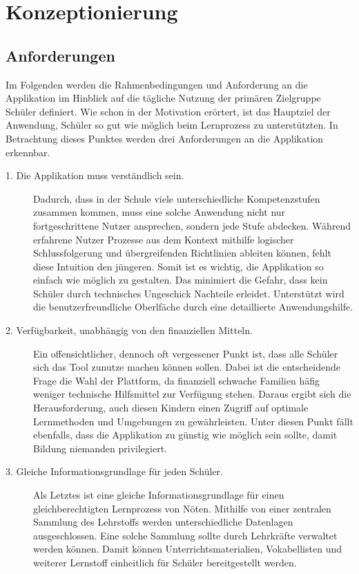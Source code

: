 \chapter{Konzeptionierung}


\section{Anforderungen}
\label{section:rahmenbedingungen}
Im Folgenden werden die Rahmenbedingungen und Anforderung an die Applikation im Hinblick auf die tägliche Nutzung der primären Zielgruppe Schüler definiert. Wie schon in der Motivation erörtert, ist das Hauptziel der Anwendung, Schüler so gut wie möglich beim Lernprozess zu unterstützten. In Betrachtung dieses Punktes werden drei Anforderungen an die Applikation erkennbar.
\begin{description}
\item[1. Die Applikation muss verständlich sein.]
Dadurch, dass in der Schule viele unterschiedliche Kompetenzstufen zusammen kommen, muss eine solche Anwendung nicht nur fortgeschrittene Nutzer ansprechen, sondern jede Stufe abdecken. Während erfahrene Nutzer Prozesse aus dem Kontext mithilfe logischer Schlussfolgerung und übergreifenden Richtlinien ableiten können, fehlt diese Intuition den jüngeren. Somit ist es wichtig, die Applikation so einfach wie möglich zu gestalten. Das minimiert die Gefahr, dass kein Schüler durch technisches Ungeschick Nachteile erleidet. Unterstützt wird die benutzerfreundliche Oberlfäche durch eine detaillierte Anwendungshilfe.
\item[2. Verfügbarkeit, unabhängig von den finanziellen Mitteln.]
Ein offensichtlicher, \break dennoch oft vergessener Punkt ist, dass alle Schüler sich das Tool zunutze machen können sollen. Dabei ist die entscheidende Frage die Wahl der Plattform, da finanziell schwache Familien häfig weniger technische Hilfsmittel zur Verfügung stehen. Daraus ergibt sich die Herausforderung, auch diesen Kindern einen Zugriff auf optimale Lernmethoden und Umgebungen zu gewährleisten. Unter diesen Punkt fällt ebenfalls, dass die Applikation zu günstig wie möglich sein sollte, damit Bildung niemanden privilegiert.
\item[3. Gleiche Informationsgrundlage für jeden Schüler.]
Als Letztes ist eine gleiche Informationsgrundlage für einen gleichberechtigten Lernprozess von Nöten. Mithilfe von einer zentralen Sammlung des Lehrstoffs werden unterschiedliche Datenlagen ausgeschlossen. Eine solche Sammlung sollte durch Lehrkräfte verwaltet werden können. Damit können Unterrichtsmaterialien, Vokabellisten und weiterer Lernstoff einheitlich für Schüler bereitgestellt werden.
\end{description}

